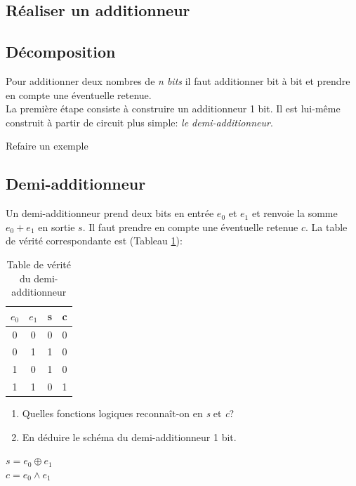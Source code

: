 \documentclass[a4paper,11pt]{article}
\begin{document}
\begin{Form}
\section{Réaliser un additionneur}
\subsection{Décomposition}
Pour additionner deux nombres de \emph{n bits} il faut additionner bit à bit et prendre en compte une éventuelle retenue.\\
La première étape consiste à construire un additionneur 1 bit. Il est lui-même construit à partir de circuit plus simple: \emph{le demi-additionneur}.
\begin{commentprof}
Refaire un exemple
\end{commentprof}
\subsection{Demi-additionneur}
Un demi-additionneur prend deux bits en entrée $e_0$ et $e_1$ et renvoie la somme $e_0+e_1$ en sortie $s$. Il faut prendre en compte une éventuelle retenue $c$. La table de vérité correspondante est (Tableau \ref{demi}):
\begin{table}[!h]
\begin{center}
\begin{tabular}{|cc||cc|}
\hline 
$e_0$ & $e_1$ & s & c \\ 
\hline 
0 & 0 & 0 & 0 \\ 
\hline 
0 & 1 & 1 & 0\\ 
\hline 
1 & 0 & 1 & 0\\
\hline 
1 & 1 & 0 & 1\\
\hline 
\end{tabular}
\caption{\label{demi}Table de vérité du demi-additionneur}
\end{center}
\end{table} 
\begin{activite}
\begin{enumerate}
\item Quelles fonctions logiques reconnaît-on en \emph{s} et \emph{c}?
\item En déduire le schéma du demi-additionneur 1 bit.
\end{enumerate}
\end{activite}
\begin{commentprof}
\noindent$s=e_0\oplus e_1$\\
$c=e_0\land e_1$
\end{commentprof}

\end{Form}
\end{document}
